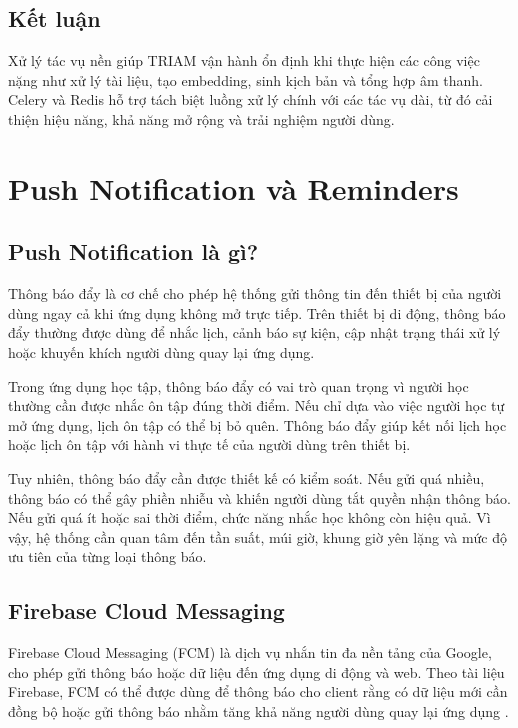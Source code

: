 \documentclass[12pt,a4paper]{report}
\begin{document}
\subsection{Kết luận}

Xử lý tác vụ nền giúp TRIAM vận hành ổn định khi thực hiện các công việc nặng như xử lý tài liệu, tạo embedding, sinh kịch bản và tổng hợp âm thanh. Celery và Redis hỗ trợ tách biệt luồng xử lý chính với các tác vụ dài, từ đó cải thiện hiệu năng, khả năng mở rộng và trải nghiệm người dùng.

\section{Push Notification và Reminders}

\subsection{Push Notification là gì?}

Thông báo đẩy là cơ chế cho phép hệ thống gửi thông tin đến thiết bị của người dùng ngay cả khi ứng dụng không mở trực tiếp. Trên thiết bị di động, thông báo đẩy thường được dùng để nhắc lịch, cảnh báo sự kiện, cập nhật trạng thái xử lý hoặc khuyến khích người dùng quay lại ứng dụng.

Trong ứng dụng học tập, thông báo đẩy có vai trò quan trọng vì người học thường cần được nhắc ôn tập đúng thời điểm. Nếu chỉ dựa vào việc người học tự mở ứng dụng, lịch ôn tập có thể bị bỏ quên. Thông báo đẩy giúp kết nối lịch học hoặc lịch ôn tập với hành vi thực tế của người dùng trên thiết bị.

Tuy nhiên, thông báo đẩy cần được thiết kế có kiểm soát. Nếu gửi quá nhiều, thông báo có thể gây phiền nhiễu và khiến người dùng tắt quyền nhận thông báo. Nếu gửi quá ít hoặc sai thời điểm, chức năng nhắc học không còn hiệu quả. Vì vậy, hệ thống cần quan tâm đến tần suất, múi giờ, khung giờ yên lặng và mức độ ưu tiên của từng loại thông báo.

\subsection{Firebase Cloud Messaging}

Firebase Cloud Messaging (FCM) là dịch vụ nhắn tin đa nền tảng của Google, cho phép gửi thông báo hoặc dữ liệu đến ứng dụng di động và web. Theo tài liệu Firebase, FCM có thể được dùng để thông báo cho client rằng có dữ liệu mới cần đồng bộ hoặc gửi thông báo nhằm tăng khả năng người dùng quay lại ứng dụng \cite{firebaseMessagingDocs}.
\end{document}
